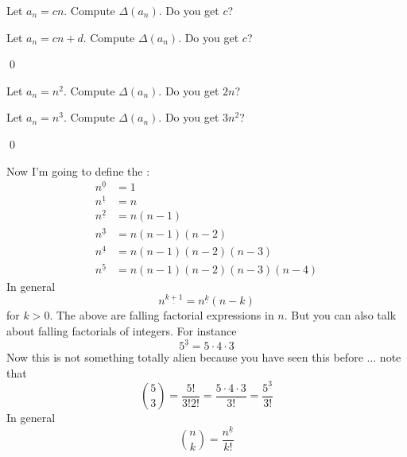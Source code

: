 \begin{ex}
  \begin{tightlist}
    \item Let $a_n = cn$. Compute $\Delta (a_n)$. Do you get $c$?
    \item Let $a_n = cn + d$. Compute $\Delta (a_n)$. Do you get $c$?
  \end{tightlist}
\qed
\end{ex}

\begin{ex}
  \begin{tightlist}
    \item Let $a_n = n^2$. Compute $\Delta (a_n)$. Do you get $2n$?
    \item Let $a_n = n^3$. Compute $\Delta (a_n)$. Do you get $3n^2$?
  \end{tightlist}
\qed
\end{ex}

Now I'm going to define the :
\begin{align*}
n^{\underline 0} &= 1 \\
n^{\underline 1} &= n \\ 
n^{\underline 2} &= n(n-1) \\ 
n^{\underline 3} &= n(n-1)(n-2) \\ 
n^{\underline 4} &= n(n-1)(n-2)(n-3) \\
n^{\underline 5} &= n(n-1)(n-2)(n-3)(n-4) 
\end{align*}
In general
\[
n^{\underline {k+1}}
=
n^{\underline {k}} (n - k)
\]
for $k > 0$.
The above are falling factorial expressions in $n$.
But you can also talk about falling factorials of integers.
For instance
\[
5^{\underline{3}} = 5 \cdot 4 \cdot 3
\]
Now this is not something totally alien because you have seen this
before ... note that
\[
\binom{5}{3} = \frac{5!}{3!2!} = \frac{5 \cdot 4 \cdot 3}{3!} = \frac{5^{\underline{3}}}{3!}
\]
In general
\[
\binom{n}{k} = \frac{n^{\underline{k}}}{k!}
\]

